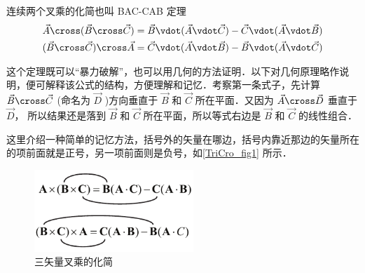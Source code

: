 
连续两个叉乘的化简也叫 BAC-CAB 定理
\begin{gather}
\vec A \cross (\vec B \cross \vec C) = \vec B \vdot (\vec A \vdot \vec C) - \vec C \vdot (\vec A \vdot \vec B)\\
(\vec B \cross \vec C) \cross \vec A = \vec C \vdot (\vec A \vdot \vec B) - \vec B \vdot (\vec A \vdot \vec C)
\end{gather}

这个定理既可以“暴力破解”，也可以用几何的方法证明．以下对几何原理略作说明，便可解释该公式的结构，方便理解和记忆．考察第一条式子，先计算 $\vec B \cross \vec C$ (命名为 $\vec D$ )方向垂直于 $\vec B$ 和 $\vec C$ 所在平面．又因为 $\vec A \cross \vec D$ 垂直于 $\vec D$， 所以结果还是落到 $\vec B$ 和 $\vec C$ 所在平面，所以等式右边是 $\vec B$ 和 $\vec C$ 的线性组合．

这里介绍一种简单的记忆方法，括号外的矢量在哪边，括号内靠近那边的矢量所在的项前面就是正号，另一项前面则是负号，如\autoref{TriCro_fig1} 所示．

\begin{figure}[ht]
\centering
\includegraphics[width=6cm]{./figures/TriCro.pdf}
\caption{三矢量叉乘的化简}\label{TriCro_fig1}
\end{figure}
 
